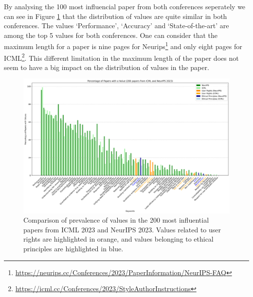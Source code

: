 \documentclass{article}
\begin{document}
By analysing the 100 most influencial paper from both conferences seperately we can see in Figure \ref{fig:percentage_comparison_conferences}
that the distribution of values are quite similar in both conferences. The values `Performance', `Accuracy' and `State-of-the-art' are among the top 5 values for both conferences. 
One can consider that the maximum length for a paper is nine pages for Neurips\footnote{\url{https://neurips.cc/Conferences/2023/PaperInformation/NeurIPS-FAQ}} and only eight pages for ICML\footnote{\url{https://icml.cc/Conferences/2023/StyleAuthorInstructions}}.
This different limitation in the maximum length of the paper does not seem to have a big impact on the distribution of values in the paper.
\begin{figure}[H]
    \centering
    \includegraphics[width=\textwidth]{../plots/percentage_comparison_conferences.png}
    \caption{Comparison of prevalence of values in the 200 most influential papers from ICML 2023 and NeurIPS 2023. Values related to user rights are highlighted in orange, and values belonging to ethical principles are highlighted in blue.}
    \label{fig:percentage_comparison_conferences}
\end{figure}
\end{document}
